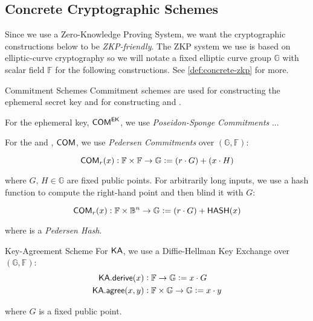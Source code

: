 

\subsection{Concrete Cryptographic Schemes}

Since we use a Zero-Knowledge Proving System, we want the cryptographic constructions below to be \emph{ZKP-friendly}. The ZKP system we use is based on elliptic-curve cryptography so we will notate a fixed elliptic curve group $\mathbb{G}$ with scalar field $\mathbb{F}$ for the following constructions. See \autoref{def:concrete-zkp} for more.

\begin{definitiontoc}{Commitment Schemes}
    Commitment schemes are used for constructing the ephemeral secret key and for constructing  and .

    For the ephemeral key, ${\textsf{COM}}^{{\textsf{EK}}}$, we use \emph{Poseidon-Sponge Commitments} ... 

    For the \UTXO{} and \VoidNumber{}, ${\textsf{COM}}$, we use \emph{Pedersen Commitments} over $(\mathbb{G}, \mathbb{F})$:

    \[{\textsf{COM}}_r(x) : \mathbb{F} \times \mathbb{F} \to \mathbb{G} := (r \cdot G) + (x \cdot H)\]

    where $G,\,H \in \mathbb{G}$ are fixed public points. For arbitrarily long inputs, we use a hash function to compute the right-hand point and then blind it with $G$:

    \[{\textsf{COM}}_r(x) : \mathbb{F} \times \mathbb{B}^n \to \mathbb{G} := (r \cdot G) + {\textsf{HASH}}(x)\]

    where \HASH{} is a \emph{Pedersen Hash}.
\end{definitiontoc}

\begin{definitiontoc}{Key-Agreement Scheme}
    For ${\textsf{KA}}$, we use a Diffie-Hellman Key Exchange over $(\mathbb{G}, \mathbb{F})$:
    \begin{align*}
        {\textsf{KA}}.{\textsf{derive}}(x)   &: \mathbb{F} \to \mathbb{G}                   := x \cdot G \\
        {\textsf{KA}}.{\textsf{agree}}(x, y) &: \mathbb{F} \times \mathbb{G} \to \mathbb{G} := x \cdot y
    \end{align*}

    where $G$ is a fixed public point.
\end{definitiontoc}

